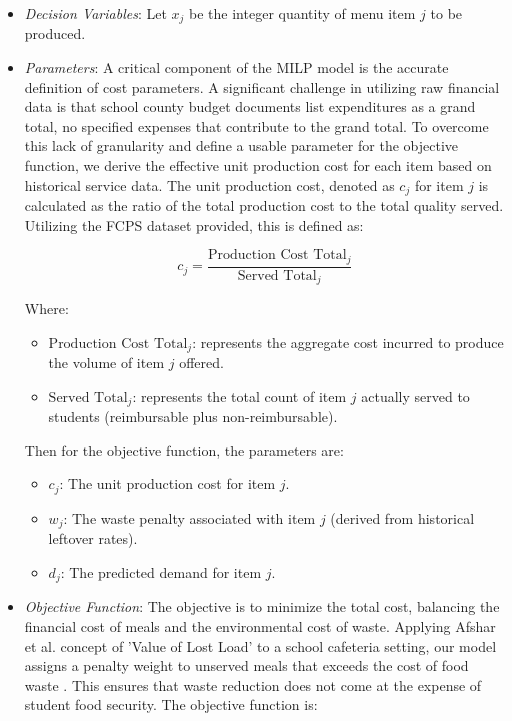 \documentclass{scrartcl}
\begin{document}
\begin{itemize}
    \item \textit{Decision Variables}: Let $x_j$ be the integer quantity of menu item $j$ to be produced.
    \item \textit{Parameters}: A critical component of the MILP model is the accurate definition of cost parameters. A significant challenge in utilizing raw financial data is that school county budget documents list expenditures as a grand total, no specified expenses that contribute to the grand total. To overcome this lack of granularity and define a usable parameter for the objective function, we derive the effective unit production cost for each item based on historical service data. The unit production cost, denoted as $c_j$ for item $j$ is calculated as the ratio of the total production cost to the total quality served. Utilizing the FCPS dataset provided, this is defined as:

    \begin{equation}
        c_j = \frac{\text{Production Cost Total}_j}{\text{Served Total}_j}
    \end{equation}

    Where:
    \begin{itemize}
        \item $\text{Production Cost Total}_j$: represents the aggregate cost incurred to produce the volume of item $j$ offered.
        \item $\text{Served Total}_j$: represents the total count of item $j$ actually served to students (reimbursable plus non-reimbursable).
    \end{itemize}

    Then for the objective function, the parameters are:
    \begin{itemize}
        \item $c_j$: The unit production cost for item $j$.
        \item $w_j$: The waste penalty associated with item $j$ (derived from historical leftover rates).
        \item $d_j$: The predicted demand for item $j$.
    \end{itemize}

    \item \textit{Objective Function}: The objective is to minimize the total cost, balancing the financial cost of meals and the environmental cost of waste. Applying Afshar et al. concept of 'Value of Lost Load' to a school cafeteria setting, our model assigns a penalty weight to unserved meals that exceeds the cost of food waste \cite{afshar}. This ensures that waste reduction does not come at the expense of student food security. The objective function is:


\end{itemize}
\end{document}

